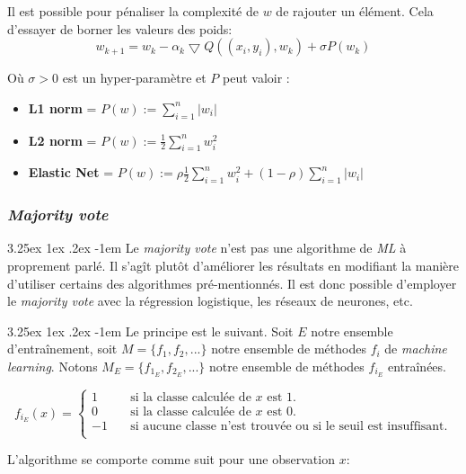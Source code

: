 \documentclass[a4paper, 11pt]{article}
\makeatletter
\renewcommand\paragraph{\@startsection{paragraph}{5}{\z@}%
  {3.25ex \@plus1ex \@minus.2ex}%
  {-1em}%
  {\normalfont\normalsize\bfseries}}
\makeatother
\begin{document}
Il est possible pour pénaliser la complexité de $w$ de rajouter un élément. Cela d'essayer de borner les valeurs des poids:
$$w_{k+1} = w_k -\alpha_k \bigtriangledown Q ((x_i,y_i), w_k) + \sigma P(w_k)$$

Où $\sigma > 0$ est un hyper-paramètre et $P$ peut valoir :
\begin{itemize}
\item \textbf{L1 norm} = $P(w) := \sum\limits_{i=1}^n |w_i|$
\item \textbf{L2 norm} = $P(w) := \frac{1}{2}\sum\limits_{i=1}^n w_i^2$
\item \textbf{Elastic Net} = $P(w) := \rho \frac{1}{2}\sum\limits_{i=1}^n w_i^2 + (1 - \rho) \sum\limits_{i=1}^n |w_i|$
\end{itemize}


\subsubsection{\textit{Majority vote}} \label{section majority vote}
\paragraph{}
Le \textit{majority vote} n'est pas une algorithme de \textit{ML} à proprement parlé. Il s'agît plutôt d'améliorer les résultats en modifiant la manière d'utiliser certains des algorithmes pré-mentionnés.
Il est donc possible d'employer le \textit{majority vote} avec la régression logistique, les réseaux de neurones, etc.

\paragraph{}
Le principe est le suivant. Soit $E$ notre ensemble d'entraînement, soit $M = \{f_1, f_2, ...\}$ notre ensemble de méthodes $f_i$ de \textit{machine learning}. Notons $M_E = \{f_{1_E}, f_{2_E}, ...\}$ notre ensemble de méthodes $f_{i_E}$ entraînées.
 
\[ f_{i_E}(x) =
  \begin{cases}
    1       & \quad \text{si la classe calculée de $x$ est 1.}\\
    0  & \quad \text{si la classe calculée de $x$ est 0.}\\
    -1 & \quad \text{si aucune classe n'est trouvée ou si le seuil est insuffisant.}\\
  \end{cases}
\]

L'algorithme se comporte comme suit pour une observation $x$:
\end{document}
